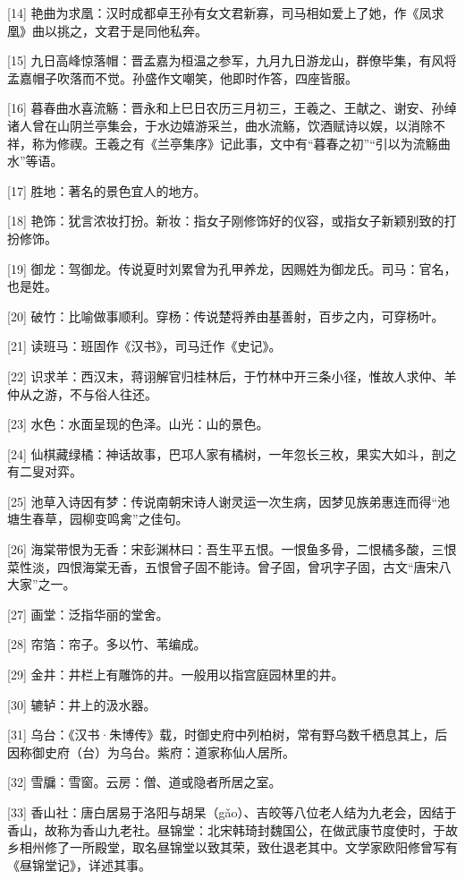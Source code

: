 \documentclass[12pt,UTF8]{ctexbook}
\begin{document}
[14] 艳曲为求凰：汉时成都卓王孙有女文君新寡，司马相如爱上了她，作《凤求凰》曲以挑之，文君于是同他私奔。

[15] 九日高峰惊落帽：晋孟嘉为桓温之参军，九月九日游龙山，群僚毕集，有风将孟嘉帽子吹落而不觉。孙盛作文嘲笑，他即时作答，四座皆服。

[16] 暮春曲水喜流觞：晋永和上巳日农历三月初三，王羲之、王献之、谢安、孙绰诸人曾在山阴兰亭集会，于水边嬉游采兰，曲水流觞，饮酒赋诗以娱，以消除不祥，称为修禊。王羲之有《兰亭集序》记此事，文中有“暮春之初”“引以为流觞曲水”等语。

[17] 胜地：著名的景色宜人的地方。

[18] 艳饰：犹言浓妆打扮。新妆：指女子刚修饰好的仪容，或指女子新颖别致的打扮修饰。

[19] 御龙：驾御龙。传说夏时刘累曾为孔甲养龙，因赐姓为御龙氏。司马：官名，也是姓。

[20] 破竹：比喻做事顺利。穿杨：传说楚将养由基善射，百步之内，可穿杨叶。

[21] 读班马：班固作《汉书》，司马迁作《史记》。

[22] 识求羊：西汉末，蒋诩解官归桂林后，于竹林中开三条小径，惟故人求仲、羊仲从之游，不与俗人往还。

[23] 水色：水面呈现的色泽。山光：山的景色。

[24] 仙棋藏绿橘：神话故事，巴邛人家有橘树，一年忽长三枚，果实大如斗，剖之有二叟对弈。

[25] 池草入诗因有梦：传说南朝宋诗人谢灵运一次生病，因梦见族弟惠连而得“池塘生春草，园柳变鸣禽”之佳句。

[26] 海棠带恨为无香：宋彭渊林曰：吾生平五恨。一恨鱼多骨，二恨橘多酸，三恨菜性淡，四恨海棠无香，五恨曾子固不能诗。曾子固，曾巩字子固，古文“唐宋八大家”之一。

[27] 画堂：泛指华丽的堂舍。

[28] 帘箔：帘子。多以竹、苇编成。

[29] 金井：井栏上有雕饰的井。一般用以指宫庭园林里的井。

[30] 辘轳：井上的汲水器。

[31] 乌台：《汉书·朱博传》载，时御史府中列柏树，常有野乌数千栖息其上，后因称御史府（台）为乌台。紫府：道家称仙人居所。

[32] 雪牖：雪窗。云房：僧、道或隐者所居之室。

[33] 香山社：唐白居易于洛阳与胡杲（gǎo）、吉皎等八位老人结为九老会，因结于香山，故称为香山九老社。昼锦堂：北宋韩琦封魏国公，在做武康节度使时，于故乡相州修了一所殿堂，取名昼锦堂以致其荣，致仕退老其中。文学家欧阳修曾写有《昼锦堂记》，详述其事。
\end{document}

